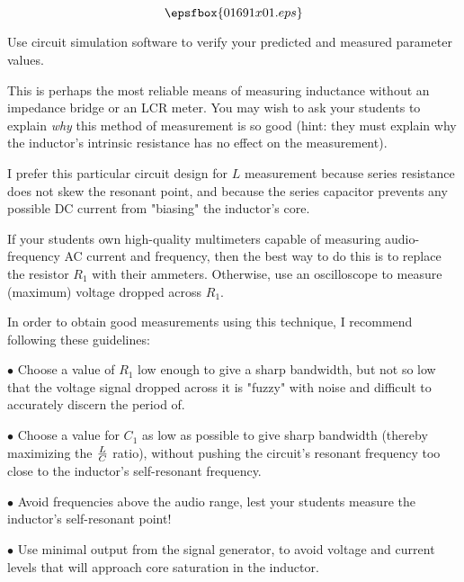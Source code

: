 

$$\epsfbox{01691x01.eps}$$

\vfil \eject






Use circuit simulation software to verify your predicted and measured parameter values.







This is perhaps the most reliable means of measuring inductance without an impedance bridge or an LCR meter.  You may wish to ask your students to explain {\it why} this method of measurement is so good (hint: they must explain why the inductor's intrinsic resistance has no effect on the measurement).

I prefer this particular circuit design for $L$ measurement because series resistance does not skew the resonant point, and because the series capacitor prevents any possible DC current from "biasing" the inductor's core.

If your students own high-quality multimeters capable of measuring audio-frequency AC current and frequency, then the best way to do this is to replace the resistor $R_1$ with their ammeters.  Otherwise, use an oscilloscope to measure (maximum) voltage dropped across $R_1$.

In order to obtain good measurements using this technique, I recommend following these guidelines:

\medskip
\item{$\bullet$} Choose a value of $R_1$ low enough to give a sharp bandwidth, but not so low that the voltage signal dropped across it is "fuzzy" with noise and difficult to accurately discern the period of.
\item{$\bullet$} Choose a value for $C_1$ as low as possible to give sharp bandwidth (thereby maximizing the ${L \over C}$ ratio), without pushing the circuit's resonant frequency too close to the inductor's self-resonant frequency.
\item{$\bullet$} Avoid frequencies above the audio range, lest your students measure the inductor's self-resonant point!
\item{$\bullet$} Use minimal output from the signal generator, to avoid voltage and current levels that will approach core saturation in the inductor.
\medskip

